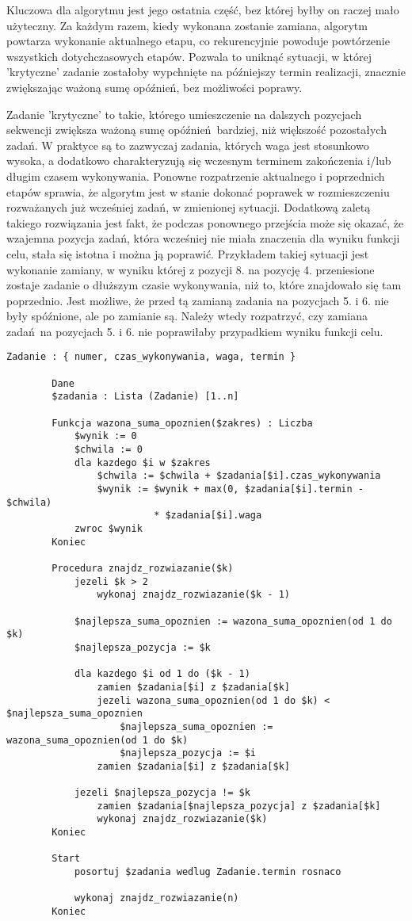 \documentclass[polish,polish,a4paper]{article}
\begin{document}
	Kluczowa dla algorytmu jest jego ostatnia część, bez której byłby on raczej mało użyteczny. Za każdym razem, kiedy wykonana zostanie zamiana, algorytm powtarza wykonanie aktualnego etapu, co rekurencyjnie powoduje powtórzenie wszystkich dotychczasowych etapów. Pozwala to uniknąć sytuacji, w której 'krytyczne' zadanie zostałoby wypchnięte na późniejszy termin realizacji, znacznie zwiększając ważoną sumę opóźnień, bez możliwości poprawy.
	
	Zadanie 'krytyczne' to takie, którego umieszczenie na dalszych pozycjach sekwencji zwiększa ważoną sumę opóźnień bardziej, niż większość pozostałych zadań. W praktyce są to zazwyczaj zadania, których waga jest stosunkowo wysoka, a dodatkowo charakteryzują się wczesnym terminem zakończenia i/lub długim czasem wykonywania. Ponowne rozpatrzenie aktualnego i poprzednich etapów sprawia, że algorytm jest w stanie dokonać poprawek w rozmieszczeniu rozważanych już wcześniej zadań, w zmienionej sytuacji. Dodatkową zaletą takiego rozwiązania jest fakt, że podczas ponownego przejścia może się okazać, że wzajemna pozycja zadań, która wcześniej nie miała znaczenia dla wyniku funkcji celu, stała się istotna i można ją poprawić. Przykładem takiej sytuacji jest wykonanie zamiany, w wyniku której z pozycji 8. na pozycję 4. przeniesione zostaje zadanie o dłuższym czasie wykonywania, niż to, które znajdowało się tam poprzednio. Jest możliwe, że przed tą zamianą zadania na pozycjach 5. i 6. nie były spóźnione, ale po zamianie są. Należy wtedy rozpatrzyć, czy zamiana zadań na pozycjach 5. i 6. nie poprawiłaby przypadkiem wyniku funkcji celu.
	
	\begin{lstlisting}[caption = Algorytm 2 - pseudokod]
		Zadanie : { numer, czas_wykonywania, waga, termin }
		
		Dane
		$zadania : Lista (Zadanie) [1..n]
		
		Funkcja wazona_suma_opoznien($zakres) : Liczba
			$wynik := 0
			$chwila := 0
			dla kazdego $i w $zakres
				$chwila := $chwila + $zadania[$i].czas_wykonywania
				$wynik := $wynik + max(0, $zadania[$i].termin - $chwila)
				          * $zadania[$i].waga
			zwroc $wynik
		Koniec
		
		Procedura znajdz_rozwiazanie($k)
			jezeli $k > 2
				wykonaj znajdz_rozwiazanie($k - 1)

			$najlepsza_suma_opoznien := wazona_suma_opoznien(od 1 do $k)
			$najlepsza_pozycja := $k

			dla kazdego $i od 1 do ($k - 1)
				zamien $zadania[$i] z $zadania[$k]
				jezeli wazona_suma_opoznien(od 1 do $k) < $najlepsza_suma_opoznien
					$najlepsza_suma_opoznien := wazona_suma_opoznien(od 1 do $k)
					$najlepsza_pozycja := $i
				zamien $zadania[$i] z $zadania[$k]

			jezeli $najlepsza_pozycja != $k
				zamien $zadania[$najlepsza_pozycja] z $zadania[$k]
				wykonaj znajdz_rozwiazanie($k)
		Koniec

		Start
			posortuj $zadania wedlug Zadanie.termin rosnaco

			wykonaj znajdz_rozwiazanie(n)
		Koniec
	\end{lstlisting}
	
\end{document}
